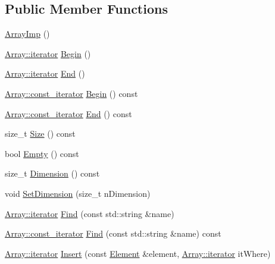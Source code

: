 \subsection*{Public Member Functions}
\begin{CompactItemize}
\item 
\hyperlink{class_p_d_i_1_1_array_imp_9321a7adb9c1104332789e4b0a848a3f}{ArrayImp} ()
\item 
\hyperlink{class_p_d_i_1_1_array_ea216852e304c9b15049c0e595378d1d}{Array::iterator} \hyperlink{class_p_d_i_1_1_array_imp_42c041637655d7b22dd25e2ded11e593}{Begin} ()
\item 
\hyperlink{class_p_d_i_1_1_array_ea216852e304c9b15049c0e595378d1d}{Array::iterator} \hyperlink{class_p_d_i_1_1_array_imp_f586e06b4c8aa7dabcabbbcbcbf31aa4}{End} ()
\item 
\hyperlink{class_p_d_i_1_1_array_3e4335ca32c34f7fd22e00e3aedc3e7f}{Array::const\_\-iterator} \hyperlink{class_p_d_i_1_1_array_imp_654604fca0ac6af51d7a0335e5f4e440}{Begin} () const 
\item 
\hyperlink{class_p_d_i_1_1_array_3e4335ca32c34f7fd22e00e3aedc3e7f}{Array::const\_\-iterator} \hyperlink{class_p_d_i_1_1_array_imp_99015acd53afcf3d7223e87e71a6e80d}{End} () const 
\item 
size\_\-t \hyperlink{class_p_d_i_1_1_array_imp_54f76deea4195d54053b8fb00fa73655}{Size} () const 
\item 
bool \hyperlink{class_p_d_i_1_1_array_imp_f2267b5d08009fe1fcd7b981306ca10b}{Empty} () const 
\item 
size\_\-t \hyperlink{class_p_d_i_1_1_array_imp_329cebf4cb01ecf5e4c0dc162e02275a}{Dimension} () const 
\item 
void \hyperlink{class_p_d_i_1_1_array_imp_055b671cf025fbb90934fd8ba5bc9918}{SetDimension} (size\_\-t nDimension)
\item 
\hyperlink{class_p_d_i_1_1_array_ea216852e304c9b15049c0e595378d1d}{Array::iterator} \hyperlink{class_p_d_i_1_1_array_imp_bbb8d18587fd1744554b8090b10b8ebb}{Find} (const std::string \&name)
\item 
\hyperlink{class_p_d_i_1_1_array_3e4335ca32c34f7fd22e00e3aedc3e7f}{Array::const\_\-iterator} \hyperlink{class_p_d_i_1_1_array_imp_835d5cd5b9a05f82b1007d14c52906b3}{Find} (const std::string \&name) const 
\item 
\hyperlink{class_p_d_i_1_1_array_ea216852e304c9b15049c0e595378d1d}{Array::iterator} \hyperlink{class_p_d_i_1_1_array_imp_ea3ee332ca946654544da5e393609c27}{Insert} (const \hyperlink{class_p_d_i_1_1_element}{Element} \&element, \hyperlink{class_p_d_i_1_1_array_ea216852e304c9b15049c0e595378d1d}{Array::iterator} itWhere)

\end{CompactItemize}
